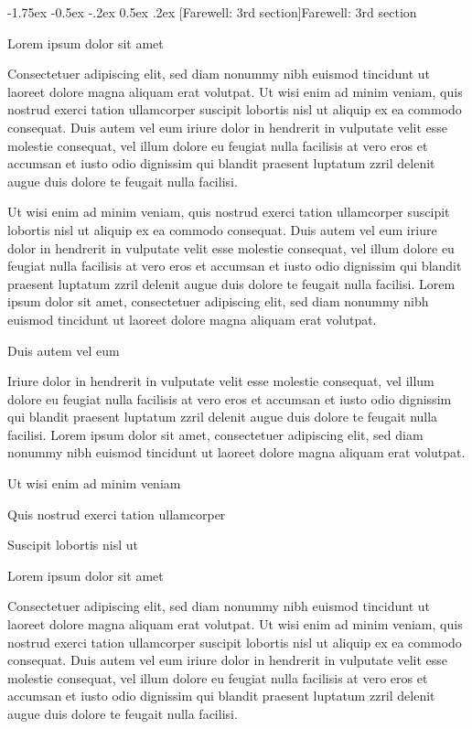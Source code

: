 \documentclass[11pt,twoside]{article}\makeatletter
\makeatletter
\renewcommand\section{\@startsection {section}{1}{\z@}%
     {-1.75ex \@plus -0.5ex \@minus -.2ex}%
     {0.5ex \@plus .2ex}%
     {\reset@font\Large\bfseries\sffamily}}
\makeatother
\begin{document}
\section[{Farewell: 3rd section}]{Farewell: 3rd section}\label{part3}\par
Lorem ipsum dolor sit amet\par
Consectetuer adipiscing elit, sed diam nonummy nibh euismod tincidunt ut laoreet dolore magna aliquam erat volutpat. Ut wisi enim ad minim veniam, quis nostrud exerci tation ullamcorper suscipit lobortis nisl ut aliquip ex ea commodo consequat. Duis autem vel eum iriure dolor in hendrerit in vulputate velit esse molestie consequat, vel illum dolore eu feugiat nulla facilisis at vero eros et accumsan et iusto odio dignissim qui blandit praesent luptatum zzril delenit augue duis dolore te feugait nulla facilisi.\par
Ut wisi enim ad minim veniam, quis nostrud exerci tation ullamcorper suscipit lobortis nisl ut aliquip ex ea commodo consequat. Duis autem vel eum iriure dolor in hendrerit in vulputate velit esse molestie consequat, vel illum dolore eu feugiat nulla facilisis at vero eros et accumsan et iusto odio dignissim qui blandit praesent luptatum zzril delenit augue duis dolore te feugait nulla facilisi. Lorem ipsum dolor sit amet, consectetuer adipiscing elit, sed diam nonummy nibh euismod tincidunt ut laoreet dolore magna aliquam erat volutpat. \par
Duis autem vel eum \par
Iriure dolor in hendrerit in vulputate velit esse molestie consequat, vel illum dolore eu feugiat nulla facilisis at vero eros et accumsan et iusto odio dignissim qui blandit praesent luptatum zzril delenit augue duis dolore te feugait nulla facilisi. Lorem ipsum dolor sit amet, consectetuer adipiscing elit, sed diam nonummy nibh euismod tincidunt ut laoreet dolore magna aliquam erat volutpat. \par
Ut wisi enim ad minim veniam\par
Quis nostrud exerci tation ullamcorper \par
Suscipit lobortis nisl ut \par
Lorem ipsum dolor sit amet\par
Consectetuer adipiscing elit, sed diam nonummy nibh euismod tincidunt ut laoreet dolore magna aliquam erat volutpat. Ut wisi enim ad minim veniam, quis nostrud exerci tation ullamcorper suscipit lobortis nisl ut aliquip ex ea commodo consequat. Duis autem vel eum iriure dolor in hendrerit in vulputate velit esse molestie consequat, vel illum dolore eu feugiat nulla facilisis at vero eros et accumsan et iusto odio dignissim qui blandit praesent luptatum zzril delenit augue duis dolore te feugait nulla facilisi.\par
\end{document}
